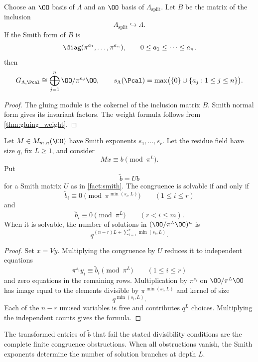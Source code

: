 \begin{proposition}\label{prop:weight_from_inclusion}
Choose an $\OO$ basis of $\Lambda$ and an $\OO$ basis of $\Lambda_{\mathrm{split}}$.  Let $B$ be the matrix of the inclusion
\[
\Lambda_{\mathrm{split}}\hookrightarrow\Lambda.
\]
If the Smith form of $B$ is
\[
\diag(\pi^{a_1},\ldots,\pi^{a_n}),
\qquad
0\leq a_1\leq\cdots\leq a_n,
\]
then
\[
G_{\Lambda,\Pcal}
\cong
\bigoplus_{j=1}^n\OO/\pi^{a_j}\OO,
\qquad
s_\Lambda(\Pcal)=\max\bigl(\{0\}\cup\{a_j:1\leq j\leq n\}\bigr).
\]
\end{proposition}

\begin{proof}
The gluing module is the cokernel of the inclusion matrix $B$.  Smith normal form gives its invariant factors.  The weight formula follows from \cref{thm:gluing_weight}.
\end{proof}

\begin{theorem}\label{thm:smith_congruence}
Let $M\in M_{m,n}(\OO)$ have Smith exponents $s_1,\ldots,s_r$.  Let the residue field have size $q$, fix $L\geq1$, and consider
\[
Mx\equiv b\pmod{\pi^L}.
\]
Put
\[
\widetilde b=Ub
\]
for a Smith matrix $U$ as in \cref{fact:smith}.  The congruence is solvable if and only if
\[
\widetilde b_i\equiv0
\pmod{\pi^{\min(s_i,L)}}
\qquad(1\leq i\leq r)
\]
and
\[
\widetilde b_i\equiv0
\pmod{\pi^L}
\qquad(r<i\leq m).
\]
When it is solvable, the number of solutions in $(\OO/\pi^L\OO)^n$ is
\[
\boxed{
q^{(n-r)L+\sum_{i=1}^r\min(s_i,L)}.
}
\]
\end{theorem}

\begin{proof}
Set $x=Vy$.  Multiplying the congruence by $U$ reduces it to independent equations
\[
\pi^{s_i}y_i\equiv\widetilde b_i\pmod{\pi^L}
\qquad(1\leq i\leq r)
\]
and zero equations in the remaining rows.  Multiplication by $\pi^{s_i}$ on $\OO/\pi^L\OO$ has image equal to the elements divisible by $\pi^{\min(s_i,L)}$ and kernel of size
\[
q^{\min(s_i,L)}.
\]
Each of the $n-r$ unused variables is free and contributes $q^L$ choices.  Multiplying the independent counts gives the formula.
\end{proof}

\begin{corollary}\label{cor:smith_obstruction}
The transformed entries of $\widetilde b$ that fail the stated divisibility conditions are the complete finite congruence obstructions.  When all obstructions vanish, the Smith exponents determine the number of solution branches at depth $L$.
\end{corollary}

